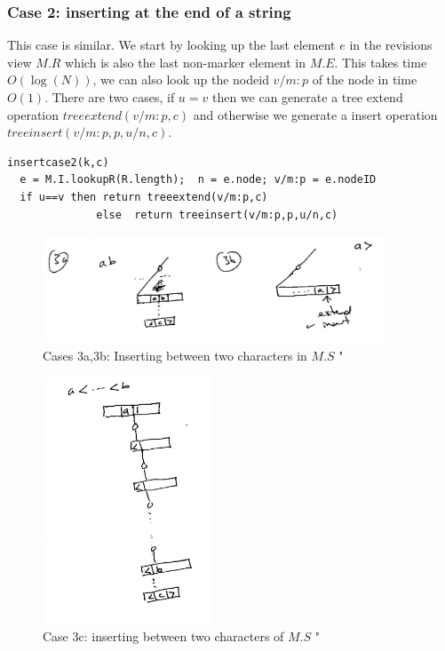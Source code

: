\documentclass{amsart}
\begin{document}
\subsubsection{Case 2: inserting at the end of a string}
This case is similar. We start by looking up the last element $e$ in the revisions view $M.R$ which is also the last non-marker element in $M.E$. This takes time $O(\log(N))$, we can also look up the nodeid $v/m:p$ of the node in time $O(1)$.  There are
two cases, if $u=v$ then we can generate a tree extend operation
$treeextend(v/m:p,c)$ and otherwise we generate a insert operation
$treeinsert(v/m:p,p,u/n,c)$.
\begin{verbatim}
insertcase2(k,c)
  e = M.I.lookupR(R.length);  n = e.node; v/m:p = e.nodeID
  if u==v then return treeextend(v/m:p,c)
              else  return treeinsert(v/m:p,p,u/n,c)
\end{verbatim}

\begin{figure}[h]
\centering
\includegraphics[width=4.0in]{insertMiddle001.jpg}
\caption{Cases 3a,3b: Inserting between two characters in $M.S$ \label{fig:midinsert}"}
\end{figure}

\begin{figure}[h]
\centering
\includegraphics[width=2.0in]{insertMiddle002.jpg}
\caption{Case 3c: inserting between two characters of $M.S$ \label{fig:frontinsert}"}
\end{figure}
\end{document}
